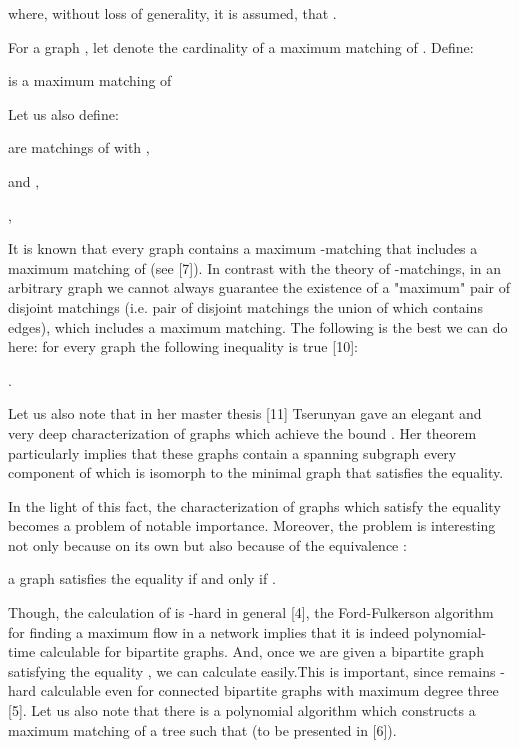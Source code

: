 \documentclass{article}
\begin{document}
where, without loss of generality, it is assumed, that .

For a graph , let  denote the cardinality of a maximum
matching of . Define:

\begin{center}
 is a maximum matching of 




\end{center}

Let us also define:

\begin{center}
are matchings of  with ,

  and ,

 ,


\end{center}

It is known that every graph  contains a maximum -matching that
includes a maximum matching of  (see [7]). In contrast with the theory of 
-matchings, in an arbitrary graph  we cannot always guarantee the
existence of a "maximum" pair of disjoint matchings (i.e. pair of disjoint
matchings the union of which contains  edges), which includes a
maximum matching. The following is the best we can do here: for every graph  the following inequality is true [10]:

\begin{center}
 .
\end{center}

Let us also note that in her master thesis [11] Tserunyan gave an elegant
and very deep characterization of graphs which achieve the bound . Her theorem particularly implies that these graphs contain a spanning
subgraph every component of which is isomorph to the minimal graph that
satisfies the  equality.

In the light of this fact, the characterization of graphs which satisfy the  equality becomes a problem of notable importance. Moreover,
the problem is interesting not only because on its own but also because of
the equivalence :

\begin{center}
a graph  satisfies the equality  if and only if .
\end{center}

Though, the calculation of  is -hard in general [4], the
Ford-Fulkerson algorithm for finding a maximum flow in a network implies
that it is indeed polynomial-time calculable for bipartite graphs. And, once
we are given a bipartite graph  satisfying the equality , we can calculate  easily.This is important, since  remains 
-hard calculable even for connected bipartite graphs  with maximum
degree three [5]. Let us also note that there is a polynomial algorithm
which constructs a maximum matching  of a tree  such that  (to be presented in [6]).
\end{document}
